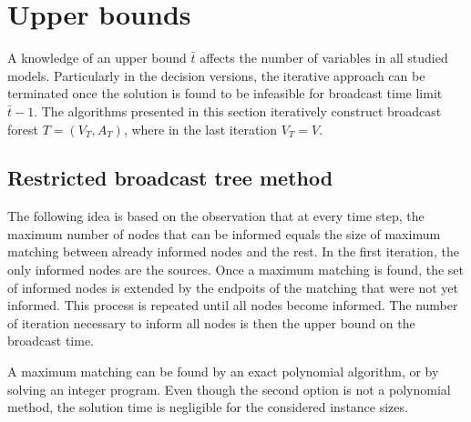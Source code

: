 \section{Upper bounds} \label{sec:ub}

A knowledge of an upper bound $\bar{t}$ affects the number of variables in all studied models. 
Particularly in the decision versions, the iterative approach can be terminated once the solution is found to be infeasible for broadcast time limit $\bar{t}-1$.
The algorithms presented in this section iteratively construct broadcast forest $T=(V_T,A_T)$, where in the last iteration $V_T=V$.

\subsection{Restricted broadcast tree method}

The following idea is based on the observation that at every time step, the maximum number of nodes that can be informed equals the size of maximum matching between already informed nodes and the rest.
In the first iteration, the only informed nodes are the sources.
Once a maximum matching is found, the set of informed nodes is extended by the endpoits of the matching that were not yet informed.
This process is repeated until all nodes become informed.
The number of iteration necessary to inform all nodes is then the upper bound on the broadcast time.

A maximum matching can be found by an exact polynomial algorithm, or by solving an integer program.
Even though the second option is not a polynomial method, the solution time is negligible for the considered instance sizes.

